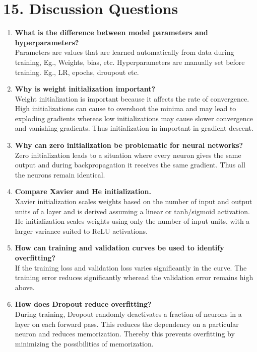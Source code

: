 \documentclass[10pt]{article}
\begin{document}
\section*{15. Discussion Questions}

\begin{enumerate}

\item \textbf{What is the difference between model parameters and hyperparameters?}\\
Parameters are values that are learned automatically from
data during training, Eg., Weights, bias, etc. Hyperparameters are manually set before training. Eg., LR, epochs, droupout etc.

\item \textbf{Why is weight initialization important?}\\
Weight initialization is important because it affects the rate of convergence. High initializations can cause to overshoot the minima and may lead to exploding gradients whereas low initializations may cause slower convergence and vanishing gradients. Thus initialization in important in gradient descent.

\item \textbf{Why can zero initialization be problematic for neural networks?}\\
Zero initialization leads to a situation where every neuron gives the same output and during backpropagation it receives the same gradient. Thus all the neurons remain identical.

\item \textbf{Compare Xavier and He initialization.}\\
Xavier initialization scales weights based on the number of input and output units of a layer and is derived assuming a linear or tanh/sigmoid activation. He initialization scales weights using only the number of input units, with a larger variance suited to ReLU activations.

\item \textbf{How can training and validation curves be used to identify overfitting?}\\
If the training loss and validation loss varies significantly in the curve. The training error reduces significantly wheread the validation error remains high above.

\item \textbf{How does Dropout reduce overfitting?}\\
During training, Dropout randomly deactivates a fraction of neurons in a layer on each forward pass. This reduces the dependency on a particular neuron and reduces memorization. Thereby this prevents overfitting by minimizing the possibilities of memorization.


\end{enumerate}
\end{document}

